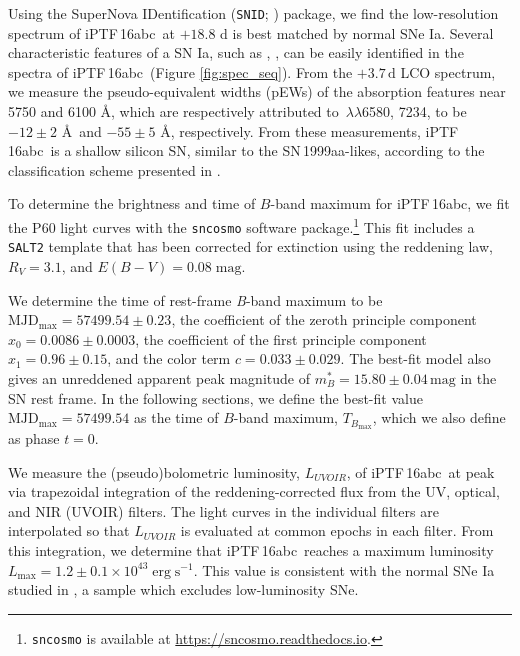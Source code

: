 \documentclass[twocolumn]{aastex61}
\newcommand{\abc}{iPTF\,16abc}
\begin{document}
Using the SuperNova IDentification (\texttt{SNID}; \citealt{2007ApJ...666.1024B}) package, 
we find the low-resolution spectrum of \abc\ at $+18.8$ d is best matched by normal SNe Ia. Several characteristic features of a SN
Ia, such as , , can be easily identified in the spectra of \abc\ (Figure \ref{fig:spec_seq}). From the $+3.7 \, \mathrm{d}$ LCO spectrum, we measure the pseudo-equivalent widths (pEWs) of the absorption features near 5750 and 6100 \AA, which are respectively attributed to \,$\lambda\lambda$6580, 7234, to be $-12 \pm 2$ \AA\ and $-55 \pm 5$ \AA, respectively. From these measurements, \abc\ is a shallow silicon SN, similar to the SN\,1999aa-likes, according to the classification scheme presented in \citet{2009PASP..121..238B}.

To determine the brightness and time of $B$-band maximum for 
\abc, we fit the P60 light curves with the \texttt{sncosmo} software package.\footnote{\texttt{sncosmo} is available at
  \url{https://sncosmo.readthedocs.io}.} This fit includes a \texttt{SALT2} template \citep{2007A&A...466...11G} that has been corrected for extinction using the \citep{1999PASP..111...63F} reddening law, $R_V=3.1$, and $E(B-V) = 0.08 \; \mathrm{mag}$.

We determine the time of rest-frame \textit{B}-band maximum to be 
 $\textrm{MJD}_\mathrm{max}=57499.54\pm0.23$, the coefficient
of the zeroth principle component $x_0 = 0.0086 \pm 0.0003$, the
coefficient of the first principle component $x_1 = 0.96 \pm 0.15$, 
and the color term $c = 0.033 \pm 0.029$. The best-fit model also 
gives an unreddened apparent peak magnitude of $m^*_{B}=15.80 \pm 
0.04 \,\textrm{mag}$ in the SN rest frame. In the following sections, we define the best-fit value $\textrm{MJD}_\mathrm{max}=57499.54$ as the time of $B$-band maximum, $T_{B_\mathrm{max}}$, which we also define as phase $t=0$.

We measure the (pseudo)bolometric luminosity, $L_{UVOIR}$, of \abc\ at peak via trapezoidal integration of the reddening-corrected flux from the UV, optical, and NIR (UVOIR) filters. The light curves in the individual filters are interpolated so that $L_{UVOIR}$ is evaluated at common epochs in each filter. From this integration, we determine that \abc\ reaches a maximum luminosity $L_\mathrm{max} = 1.2 \pm 0.1 \times 10^{43} \; \mathrm{erg \; s}^{-1}$. This value is consistent with the normal SNe Ia studied in  \citet{2016A&A...588A..84D}, a sample which excludes low-luminosity SNe.
\end{document}
